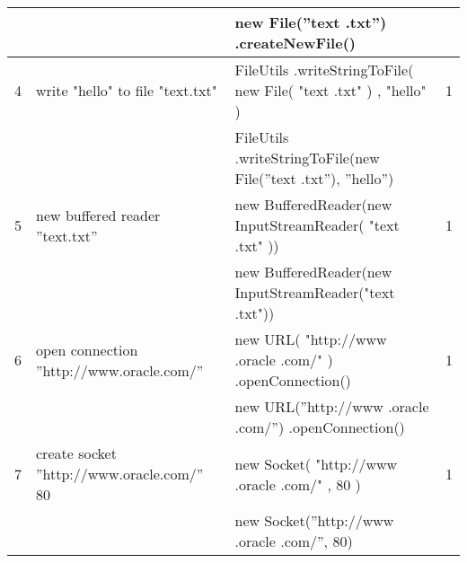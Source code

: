 \begin{longtable}{|p{}|p{}|p{}|p{}|}
		\rowcolor[HTML]{9AFF99} 
		&                                                        & new File(”text .txt”) .createNewFile()                                                                           &                                         \\ \hline
		\rowcolor[HTML]{FFCCC9} 
		4                                 & write "hello" to file "text.txt"                       & FileUtils .writeStringToFile( new File( "text .txt" ) , "hello" )                                                & 1                                       \\ \hline
		\rowcolor[HTML]{9AFF99} 
		&                                                        & FileUtils .writeStringToFile(new File(”text .txt”), ”hello”)                                                     &                                         \\ \hline
		\rowcolor[HTML]{FFCCC9} 
		5                                 & new buffered reader ”text.txt”                         & new BufferedReader(new InputStreamReader( "text .txt" ))                                                         & 1                                       \\ \hline
		\rowcolor[HTML]{9AFF99} 
		&                                                        & new BufferedReader(new InputStreamReader("text .txt"))                                                           &                                         \\ \hline
		\rowcolor[HTML]{FFCCC9} 
		6                                 & open connection ”http://www.oracle.com/”               & new URL( "http://www .oracle .com/" ) .openConnection()                                                          & 1                                       \\ \hline
		\rowcolor[HTML]{9AFF99} 
		&                                                        & new URL(”http://www .oracle .com/”) .openConnection()                                                            &                                         \\ \hline
		\rowcolor[HTML]{FFCCC9} 
		7                                 & create socket ”http://www.oracle.com/” 80              & new Socket( "http://www .oracle .com/" , 80 )                                                                    & 1                                       \\ \hline
		\rowcolor[HTML]{9AFF99} 
		&                                                        & new Socket(”http://www .oracle .com/”, 80)                                                                       &                                         \\ \hline

\end{longtable}
